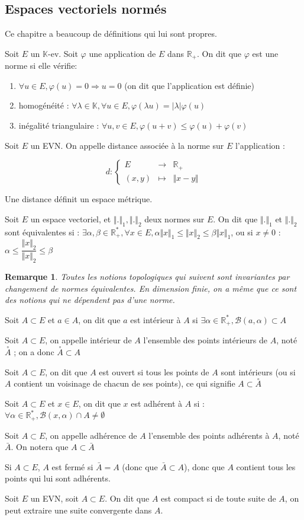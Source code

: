 \documentclass[a4paper,12pt]{book}
\newcommand{\Def}[2]{\begin{tcolorbox}[colback=white,colframe=red!10!green!20!blue!75!, title=Définition : #1]#2\end{tcolorbox}}
\newtheorem{Rem}{Remarque}[section]
\def\R{\mathbb{R}}
\def\K{\mathbb{K}}
\begin{document}
\subsection{Espaces vectoriels normés}
Ce chapitre a beaucoup de définitions qui lui sont propres.
\Def{Norme}{Soit $E$ un $\K$-ev. Soit $\varphi$ une application de $E$ dans $\R_+$. On dit que $\varphi$ est une norme si elle vérifie:\begin{enumerate}
\item $\forall u\in E, \varphi(u) = 0\Rightarrow u=0$ (on dit que l'application est définie)
\item homogénéité : $\forall\lambda\in\K, \forall u\in E,\varphi(\lambda u) =\vert \lambda\vert \varphi(u)$
\item inégalité triangulaire : $\forall u, v\in E, \varphi(u+v) \leq \varphi(u)+\varphi(v)$
\end{enumerate}}
\Def{Distance}{Soit $E$ un EVN. On appelle distance associée à la norme sur $E$ l'application :
\par $$d:\left\{\begin{array}{rcl} E & \to & \R_+ \\ (x,y) & \mapsto & \Vert x-y\Vert \end{array}\right.$$
\par Une distance définit un espace métrique.}
\Def{Normes équivalentes}{Soit $E$ un espace vectoriel, et $\Vert.\Vert_1, \Vert.\Vert_2$ deux normes sur $E$. On dit que $\Vert.\Vert_1$ et $\Vert.\Vert_2$ sont équivalentes si : $\exists \alpha,\beta\in\R_+^*,\forall x\in E, \alpha\Vert x\Vert_1\leq \Vert x\Vert_2\leq \beta\Vert x\Vert_1$, ou si $x\neq0$ : $\alpha\leq\dfrac{\Vert x\Vert_2}{\Vert x\Vert_2}\leq\beta$}
\begin{Rem}
Toutes les notions topologiques qui suivent sont invariantes par changement de normes équivalentes. En dimension finie, on a même que ce sont des notions qui ne dépendent pas d'une norme.
\end{Rem}
\Def{Point intérieur}{Soit $A\subset E$ et $a\in A$, on dit que $a$ est intérieur à $A$ si $\exists\alpha\in\R_+^*,\mathcal{B}(a,\alpha)\subset A$}
\Def{Intérieur}{Soit $A\subset E$, on appelle intérieur de $A$ l'ensemble des points intérieurs de $A$, noté $\overset{\circ}{A}$ ; on a donc $\overset{\circ}{A}\subset A$}
\Def{Ouvert}{Soit $A\subset E$, on dit que $A$ est ouvert si tous les points de $A$ sont intérieurs (ou si $A$ contient un voisinage de chacun de ses points), ce qui signifie $A\subset\overset{\circ}{A}$}
\Def{Point adhérent}{Soit $A\subset E$ et $x\in E$, on dit que $x$ est adhérent à $A$ si : $\forall\alpha\in\R_+^*, \mathcal{B}(x,\alpha)\cap A\neq\emptyset$}
\Def{Adhérence}{Soit $A\subset E$, on appelle adhérence de $A$ l'ensemble des points adhérents à $A$, noté $\bar{A}$. On notera que $A\subset\bar{A}$}
\Def{Fermé}{Si $A\subset E$, $A$ est fermé si $\bar{A}=A$ (donc que $\bar{A}\subset A$), donc que $A$ contient tous les points qui lui sont adhérents.}
\Def{Compact}{Soit $E$ un EVN, soit $A\subset E$. On dit que $A$ est compact si de toute suite de $A$, on peut extraire une suite convergente dans $A$.}
\end{document}
